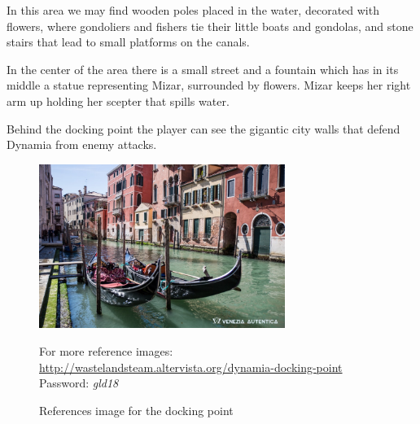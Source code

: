 In this area we may find wooden poles placed in the water, decorated with flowers, where gondoliers and fishers tie their little boats and gondolas, and  stone stairs that lead to small platforms on the canals.

In the center of the area there is a small street and a fountain which has in its middle a statue representing Mizar, surrounded by flowers. Mizar keeps her right arm up holding her scepter that spills water.

Behind the docking point the player can see the gigantic city walls that defend Dynamia from enemy attacks.

\begin{figure}[H]
    \centering
    \includegraphics[width=8cm]{Images/Landmarks/dockingPoint}
    \caption{References image for the docking point}
    For more reference images: \href{http://wastelandsteam.altervista.org/dynamia-docking-point}{http://wastelandsteam.altervista.org/dynamia-docking-point}\\Password: \textit{gld18}
  \end{figure}

